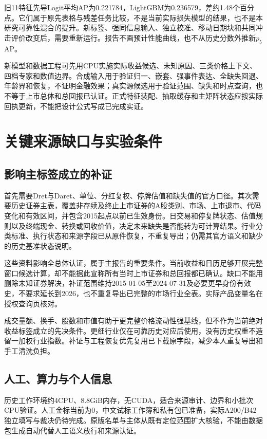 旧11特征先导Logit平均AP为0.221784，LightGBM为0.236579，差约1.48个百分点。它们属于原先表格与残差任务比较，不是当前实际损失模型的结果，也不是本研究可靠性混合的提升。新标签、强同信息输入、独立校准、移动日期块和共同冲击评价改变后，需要重新运行。报告不画预计性能曲线，也不从历史分数外推新$p_5$ AP。

新模型和数据工程可先用CPU实施实际收益候选、未知原因、三类价格上下文、四档专家和数值边界。合成输入用于验证归一、嵌套、强事件表达、全缺失回退、年龄界和恢复，不证明金融效果；真实源候选用于验证范围、缺失和时点查询，也不等于上市总体和总回报已认证。正式特征装配、抽取缓存和主矩阵状态应按实际回执更新，不能把设计公式写成已完成实证。

\section{关键来源缺口与实验条件}
\subsection{影响主标签成立的补证}
首先需要Dret与Daret、单位、分红复权、停牌估值和缺失值的官方口径。其次需要历史证券主表，覆盖非存续及终止上市证券的A股类别、市场、上市退市、代码变化和有效区间，并包含2015起点以前已生效身份。日交易和停复牌状态、估值规则以及终端现金、转换或回收价值，决定未来缺失是否能转为可计算结果。行业分类标准、执行状态和来源字段已从原件恢复，不重复导出；仍需其官方语义和缺少的历史基准状态说明。

这些资料影响全总体认证，属于主报告的重要条件。当前收益和日历足够开展完整窗口候选计算，却不能据此宣称所有当时上市证券和总回报都已确认。缺口不能用删除未知证券解决，补证范围维持2015-01-05至2024-07-31及必要更早身份有效史，不要求延长到2026，也不重复导出已完整的市场行业全表。实际产品变量名在授权查询页核对。

成交量额、换手、股数和市值有助于更完整价格流动性强基线，但不作为当前绝对收益标签成立的先决条件。更细行业仅在可靠历史对应后使用，没有历史权重不造留一加权行业指数。补证与工程恢复优先复用已下载原字段，减少本人重复导出和手工清洗负担。

\subsection{人工、算力与个人信息}
历史工作环境约4CPU、8.8GiB内存，无CUDA，适合来源审计、边界和小批次CPU验证。人工金标当前为0，中文试标工作簿和私有包已准备，实际A200/B42独立填写与裁决仍待完成。原版名单与主体从既有定位范围扩大核验，不能由数据包生成自动代替人工语义放行和来源认证。

